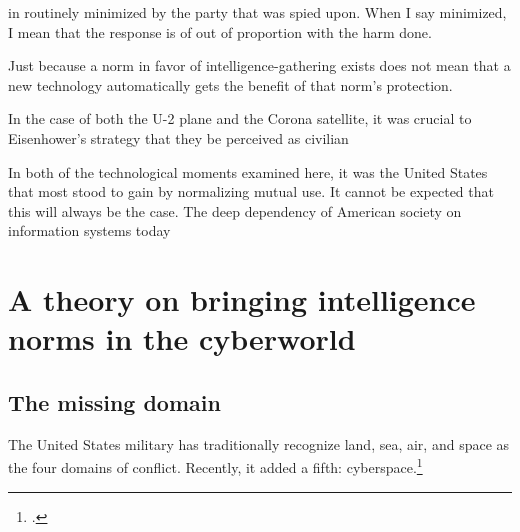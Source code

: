 \documentclass{report}
\begin{document}


in routinely minimized by the party that was spied upon. When I say minimized, I mean that the response is of out of proportion with the harm done.

Just because a norm in favor of intelligence-gathering exists does not mean that a new technology automatically gets the benefit of that norm's protection.

In the case of both the U-2 plane and the Corona satellite, it was crucial to Eisenhower's strategy that they be perceived as civilian

In both of the technological moments examined here, it was the United States that most stood to gain by normalizing mutual use. It cannot be expected that this will always be the case. The deep dependency of American society on information systems today

\section{A theory on bringing intelligence norms in the cyberworld}
\subsection{The missing domain}
The United States military has traditionally recognize land, sea, air, and space as the four domains of conflict. Recently, it added a fifth: cyberspace.\footcite{carafano_americas_2018}
\end{document}
